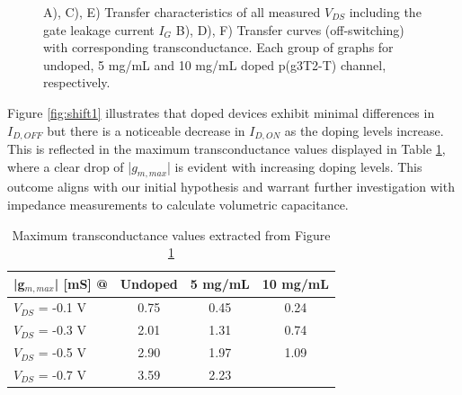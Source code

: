 \begin{figure}[!htb]
    \caption[Transfer characteristics and transconductance at different doping levels and $V_{DS}$]{A), C), E) Transfer characteristics of all measured $V_{DS}$ including the gate leakage current $I_{G}$ B), D), F) Transfer curves (off-switching) with corresponding transconductance. Each group of graphs for undoped, 5 mg/mL and 10 mg/mL doped p(g3T2-T) channel, respectively.}
    \label{fig:transx2}
\end{figure}


Figure \ref{fig:shift1} illustrates that doped devices exhibit minimal differences in $I_{D,OFF}$ but  there is a noticeable decrease in $I_{D,ON}$ as the doping levels increase. This is reflected in the maximum transconductance values displayed in Table \ref{tab:trans}, where a clear drop of |$g_{m,max}$| is evident with increasing doping levels. This outcome aligns with our initial hypothesis and warrant further investigation with impedance measurements to calculate volumetric capacitance. %


\begin{table}[ht]
\centering
\caption{Maximum transconductance values extracted from Figure \ref{fig:transx2}}
\begin{tabular}{l|c|c|c}
|g$_{m,max}$| [mS] @ & Undoped & 5 mg/mL & 10 mg/mL \\\hline
$V_{DS}$ = -0.1 V & 0.75 & 0.45 & 0.24\\
$V_{DS}$ = -0.3 V & 2.01 & 1.31 & 0.74\\
$V_{DS}$ = -0.5 V & 2.90 & 1.97 & 1.09\\
$V_{DS}$ = -0.7 V & 3.59 & 2.23 & \\ \hline
\end{tabular}
\label{tab:trans}
\end{table}

